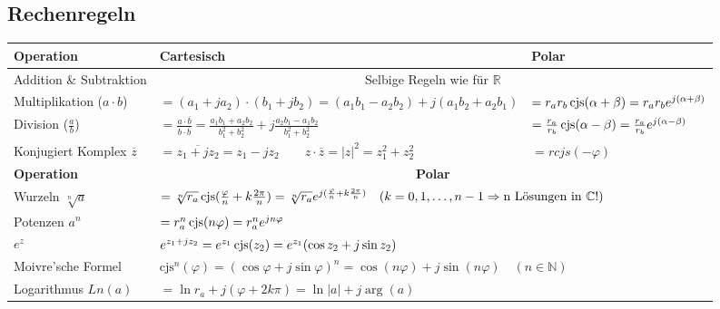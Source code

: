 	\subsection{Rechenregeln}
		\begin{center}
			\begin{tabular}{|l|l|l|}
				\hline
				\textbf{Operation} & \textbf{Cartesisch} & \textbf{Polar} \\
				\hline
				
				Addition \& Subtraktion & 
				\multicolumn{2}{|c|}{Selbige Regeln wie für
				$\mathbb{R}$}\\
				\hline
				
				Multiplikation ($a \cdot b$) &
				$ = (a_1 + j a_2) \cdot (b_1 + j b_2) = (a_1 b_1 - a_2 b_2) + j(a_1 b_2 + a_2
				b_1) $ &
				$ = r_a r_b \operatorname{cjs}(\alpha + \beta) = r_a r_b e^{j(\alpha +
				\beta)}$\\
				\hline 
				
				Division ($\frac{a}{b}$) &
				$ = \frac{a \cdot \overline{b}}{b \cdot \overline{b}}
				  = \frac{a_1 b_1 + a_2 b_2}{b_1^2 + b_2^2} + j \frac{a_2 b_1 - a_1
				  b_2}{b_1^2 + b_2^2}$ & 
				$ = \frac{r_a}{r_b} \operatorname{cjs}(\alpha - \beta) 
				  = \frac{r_a}{r_b} e^{j(\alpha - \beta)}$ \\
				\hline
			
			
				Konjugiert Komplex $\overline{z}$ &
					$ = \overline{z_1 + jz_2} = z_1 - jz_2 \qquad
					  z \cdot \overline{z} = |z|^2 = z_1^2 + z_2^2$ &
					  $ = r cjs(-\varphi)$\\
				\hline
				\hline
				
				\textbf{Operation} & \multicolumn{2}{|c|}{
					\textbf{Polar}
				} \\
				
				\hline
				Wurzeln $\sqrt[n]{a}$ &
				\multicolumn{2}{|l|}{
					$ = \sqrt[n]{r_a} \operatorname{cjs}(\frac{\varphi}{n}+k\frac{2\pi}{n}) 
					  = \sqrt[n]{r_a} e^{j(\frac{\varphi}{n} + k \frac{2\pi}{n})} \quad 
					  (k = 0, 1, \ldots, n-1 \Rightarrow \text{n Lösungen in } \mathbb{C} !)
					$
				} \\
				\hline
				
				Potenzen $a^n$ &
				\multicolumn{2}{|l|}{
					$ = r_a^n \operatorname{cjs}(n\varphi) 
					  = r_a^n e^{jn\varphi}
					$
				} \\
				\hline
				
				$e^z$ &
				\multicolumn{2}{|l|}{
					$ e^{z_1+jz_2} 
					  = e^{z_1} \operatorname{cjs}(z_2) 
					  = e^{z_1} (\cos{z_2} + j\sin{z_2})
					$
				} \\
				\hline
				
				Moivre'sche Formel &
				\multicolumn{2}{|l|}{
					$ \text{cjs}^n(\varphi) 
					  = (\cos{\varphi} + j\sin{\varphi})^n 
					  = \cos(n\varphi) +j\sin(n\varphi) \quad (n \in \mathbb{N})
					$
				} \\
				\hline
				
				Logarithmus $Ln(a)$ &
				\multicolumn{2}{|l|}{
					$ = \ln{r_a} + j (\varphi + 2k \pi) =\ln|a|+j\arg(a)$
				} \\
				\hline
			\end{tabular}
		\end{center}

